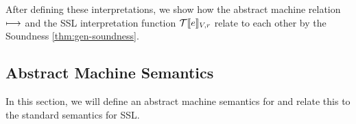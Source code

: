 After defining these interpretations, we show how the abstract machine relation $\longmapsto$ and the SSL interpretation function $\mathcal{T}\llbracket e\rrbracket_{V,r}$ relate to each other by the Soundness \autoref{thm:gen-soundness}.

%
%
%


\subsection{Abstract Machine Semantics}
In this section, we will define an abstract machine semantics for \tool and relate this to
the standard semantics for SSL.


